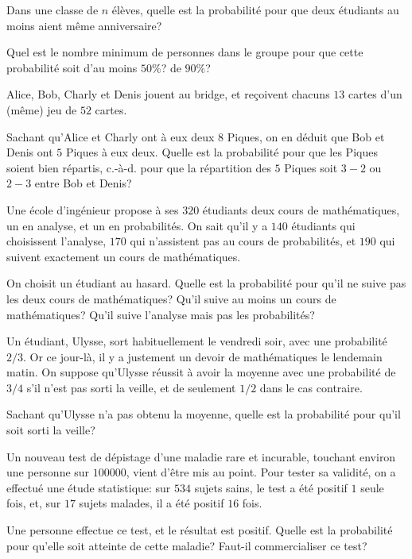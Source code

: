 \documentclass{yann}
\begin{document}

Dans une classe de $n$ élèves, quelle est la probabilité pour que
deux étudiants au moins aient même anniversaire?

Quel est le nombre minimum de personnes dans le groupe pour que
cette probabilité soit d'au moins $50\%$? de $90\%$?

\Exercice

Alice, Bob, Charly et Denis jouent au bridge, et
reçoivent chacuns $13$ cartes d'un (même) jeu de $52$ cartes.

Sachant qu'Alice et Charly ont à eux deux $8$ Piques,
on en déduit que Bob et Denis ont $5$ Piques à eux deux.
Quelle est la probabilité pour que les Piques soient \og{}bien répartis\fg{},
c.-à-d. pour que la répartition des $5$ Piques soit $3-2$ ou $2-3$ entre Bob et Denis?


Une école d'ingénieur propose à ses $320$ étudiants deux cours
de mathématiques, un en analyse, et un en probabilités.
On sait qu'il y a $140$ étudiants qui choisissent l'analyse,
$170$ qui n'assistent pas au cours de probabilités,
et $190$ qui suivent exactement un cours de mathématiques.

On choisit un étudiant au hasard. Quelle est la probabilité pour
qu'il ne suive pas les deux cours de mathématiques?
Qu'il suive au moins un cours de mathématiques?
Qu'il suive l'analyse mais pas les probabilités?

\Exercice

Un étudiant, Ulysse, sort habituellement le vendredi soir, avec une probabilité $2/3$.
Or ce jour-là, il y a justement un devoir de mathématiques le lendemain matin.
On suppose qu'Ulysse réussit à avoir la moyenne avec une probabilité
de $3/4$ s'il n'est pas sorti la veille, et de seulement $1/2$ dans le cas contraire.

Sachant qu'Ulysse n'a pas obtenu la moyenne, quelle est la probabilité pour qu'il soit sorti la veille?

\Exercice

Un nouveau test de dépistage d'une maladie rare et incurable, touchant
environ une personne sur $100000$, vient d'être mis au point.
Pour tester sa validité, on a effectué une étude statistique:
sur $534$ sujets sains, le test a été positif $1$ seule fois,
et, sur $17$ sujets malades, il a été positif $16$ fois.

Une personne effectue ce test, et le résultat est positif.
Quelle est la probabilité pour qu'elle soit atteinte de cette maladie?
Faut-il commercialiser ce test?
\end{document}

